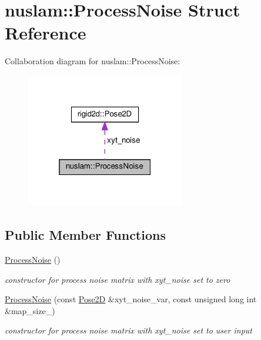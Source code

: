 \hypertarget{structnuslam_1_1ProcessNoise}{}\section{nuslam\+:\+:Process\+Noise Struct Reference}
\label{structnuslam_1_1ProcessNoise}


Collaboration diagram for nuslam\+:\+:Process\+Noise\+:\nopagebreak
\begin{figure}[H]
\begin{center}
\leavevmode
\includegraphics[width=196pt]{d7/d18/structnuslam_1_1ProcessNoise__coll__graph}
\end{center}
\end{figure}
\subsection*{Public Member Functions}
\begin{DoxyCompactItemize}
\item 
\mbox{\label{structnuslam_1_1ProcessNoise_a9127539d5903305591394d3483d8b74b}} 
\hyperlink{structnuslam_1_1ProcessNoise_a9127539d5903305591394d3483d8b74b}{Process\+Noise} ()
\begin{DoxyCompactList}\small\item\em constructor for process noise matrix with xyt\+\_\+noise set to zero \end{DoxyCompactList}\item 
\mbox{\label{structnuslam_1_1ProcessNoise_accbf7987fa5b945ecae3a11d662ee6e7}} 
\hyperlink{structnuslam_1_1ProcessNoise_accbf7987fa5b945ecae3a11d662ee6e7}{Process\+Noise} (const \hyperlink{structrigid2d_1_1Pose2D}{Pose2D} \&xyt\+\_\+noise\+\_\+var, const unsigned long int \&map\+\_\+size\+\_\+)
\begin{DoxyCompactList}\small\item\em constructor for process noise matrix with xyt\+\_\+noise set to user input \end{DoxyCompactList}\end{DoxyCompactItemize}
